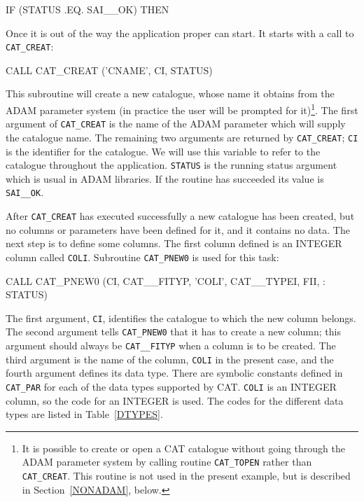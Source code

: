 \documentclass[11pt,twoside]{starlink}
\begin{document}
\begin{terminalv}
      IF (STATUS .EQ. SAI__OK) THEN
\end{terminalv}

Once it is out of the way the application proper can start. It starts
with a call to \texttt{CAT\_CREAT}:

\begin{terminalv}
      CALL CAT_CREAT ('CNAME', CI, STATUS)
\end{terminalv}

This subroutine will create a new catalogue, whose name it obtains
from the ADAM parameter system (in practice the user will be prompted
for it)\footnote{It is possible to create or open a CAT catalogue
without going through the ADAM parameter system by calling routine
\texttt{CAT\_TOPEN} rather than \texttt{CAT\_CREAT}. This routine is not used
in the present example, but is described in Section~\ref{NONADAM},
below.}. The first argument of \texttt{CAT\_CREAT} is the name of the ADAM
parameter which will supply the catalogue name. The remaining two
arguments are returned by \texttt{CAT\_CREAT}; \texttt{CI} is the identifier
for the catalogue. We will use this variable to refer to the catalogue
throughout the application. \texttt{STATUS} is the running status argument
which is usual in ADAM libraries. If the routine has succeeded its value
is \texttt{SAI\_\_OK}.

After \texttt{CAT\_CREAT} has executed successfully a new catalogue has
been created, but no columns or parameters have been defined for it,
and it contains no data. The next step is to define some columns. The
first column defined is an INTEGER column called \texttt{COLI}. Subroutine
\texttt{CAT\_PNEW0} is used for this task:

\begin{terminalv}
         CALL CAT_PNEW0 (CI, CAT__FITYP, 'COLI', CAT__TYPEI, FII,
     :     STATUS)
\end{terminalv}

The first argument, \texttt{CI}, identifies the catalogue to which the
new column belongs. The second argument tells \texttt{CAT\_PNEW0} that it
has to create a new column; this argument should always be \texttt{CAT\_\_FITYP} when a column is to be created. The third argument is the
name of the column, \texttt{COLI} in the present case, and the fourth
argument defines its data type. There are symbolic constants defined in
\texttt{CAT\_PAR} for each of the data types supported by CAT. \texttt{COLI}
is an INTEGER column, so the code for an INTEGER is used. The codes for
the different data types are listed in Table~\ref{DTYPES}.
\end{document}
